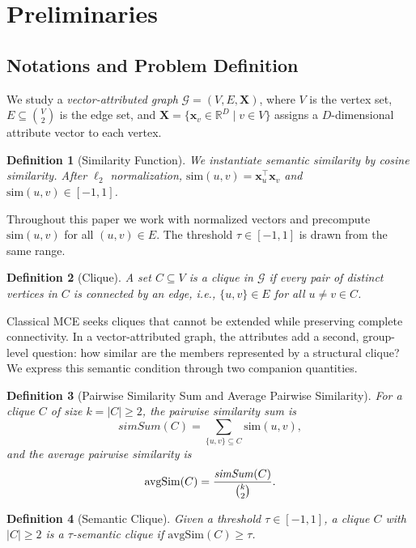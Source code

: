 \documentclass[sigconf, nonacm]{acmart}
\newtheorem{definition}{Definition}
\newcommand{\avgsim}{\mathrm{avgSim}}
\newcommand{\simsum}{\mathit{simSum}}
\begin{document}
\section{Preliminaries}
\label{sec:pre}

\subsection{Notations and Problem Definition}

We study a \emph{vector-attributed graph} $\mathcal{G}=(V,E,\mathbf{X})$,
where $V$ is the vertex set, $E \subseteq \binom{V}{2}$ is the edge set,
and $\mathbf{X}=\{\mathbf{x}_v \in \mathbb{R}^D \mid v \in V\}$ assigns a
$D$-dimensional attribute vector to each vertex.

\begin{definition}[Similarity Function]
  We instantiate semantic similarity by cosine similarity. After
  $\ell_2$ normalization, $\mathrm{sim}(u,v)=\mathbf{x}_u^\top\mathbf{x}_v$
  and $\mathrm{sim}(u,v)\in[-1,1]$.
\end{definition}

Throughout this paper we work with normalized vectors and precompute
$\mathrm{sim}(u,v)$ for all $(u,v)\in E$.  The threshold $\tau \in [-1,1]$
is drawn from the same range.

\begin{definition}[Clique]
  A set $C \subseteq V$ is a \emph{clique} in $\mathcal{G}$ if every pair of distinct
  vertices in $C$ is connected by an edge, i.e., $\{u,v\} \in E$ for all $u \neq v \in C$.
\end{definition}

Classical MCE seeks cliques that cannot be extended while preserving complete
connectivity. In a vector-attributed graph, the attributes add a second,
group-level question: how similar are the members represented by a structural
clique? We express this semantic condition through two companion quantities.

\begin{definition}[Pairwise Similarity Sum and Average Pairwise Similarity]
  For a clique $C$ of size $k = |C| \geq 2$, the \emph{pairwise similarity sum} is
  \[
    \simsum(C) = \sum_{\{u,v\}\subseteq C}\mathrm{sim}(u,v),
  \]
  and the \emph{average pairwise similarity} is
  \[
    \avgsim(C) = \frac{\simsum(C)}{\tbinom{k}{2}}.
  \]
\end{definition}

\begin{definition}[Semantic Clique]
  \label{def:semantic-clique}
  Given a threshold $\tau \in [-1,1]$, a clique $C$ with $|C|\geq2$ is a
  \emph{$\tau$-semantic clique} if $\avgsim(C) \geq \tau$.
\end{definition}
\end{document}
